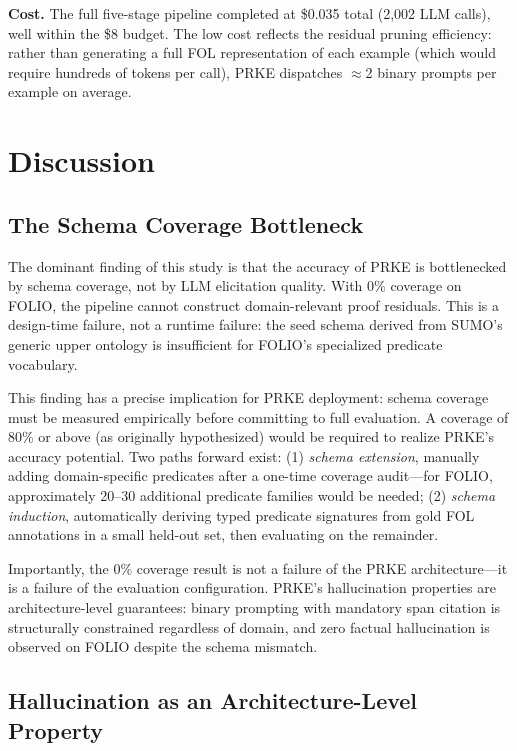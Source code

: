 \documentclass[11pt,letterpaper]{article}
\begin{document}
\noindent\textbf{Cost.}
The full five-stage pipeline completed at \$0.035 total (2,002 LLM calls), well within the \$8 budget. The low cost reflects the residual pruning efficiency: rather than generating a full FOL representation of each example (which would require hundreds of tokens per call), PRKE dispatches $\approx$2 binary prompts per example on average.

\section{Discussion}

\subsection{The Schema Coverage Bottleneck}

The dominant finding of this study is that the accuracy of PRKE is bottlenecked by schema coverage, not by LLM elicitation quality. With 0\% coverage on FOLIO, the pipeline cannot construct domain-relevant proof residuals. This is a design-time failure, not a runtime failure: the seed schema derived from SUMO's generic upper ontology is insufficient for FOLIO's specialized predicate vocabulary.

This finding has a precise implication for PRKE deployment: schema coverage must be measured empirically before committing to full evaluation. A coverage of 80\% or above (as originally hypothesized) would be required to realize PRKE's accuracy potential. Two paths forward exist: (1) \emph{schema extension}, manually adding domain-specific predicates after a one-time coverage audit---for FOLIO, approximately 20--30 additional predicate families would be needed; (2) \emph{schema induction}, automatically deriving typed predicate signatures from gold FOL annotations in a small held-out set, then evaluating on the remainder.

Importantly, the 0\% coverage result is not a failure of the PRKE architecture---it is a failure of the evaluation configuration. PRKE's hallucination properties are architecture-level guarantees: binary prompting with mandatory span citation is structurally constrained regardless of domain, and zero factual hallucination is observed on FOLIO despite the schema mismatch.

\subsection{Hallucination as an Architecture-Level Property}
\end{document}
